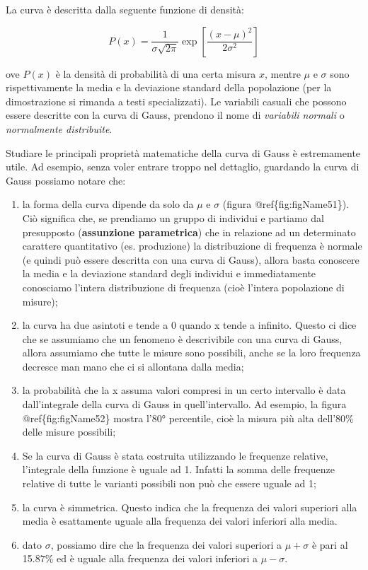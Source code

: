 \documentclass[a4paper,12pt,oneside]{book}
\providecommand{\tightlist}{%
  \setlength{\itemsep}{0pt}\setlength{\parskip}{0pt}}
\theoremstyle{definition}
\theoremstyle{definition}
\theoremstyle{definition}
\theoremstyle{remark}
\begin{document}
La curva è descritta dalla seguente funzione di densità:

\[P(x) = \frac{1}{{\sigma \sqrt {2\pi } }}\exp \left[{\frac{\left( {x - \mu } \right)^2 }{2\sigma ^2 }} \right]\]

ove \(P(x)\) è la densità di probabilità di una certa misura \(x\),
mentre \(\mu\) e \(\sigma\) sono rispettivamente la media e la
deviazione standard della popolazione (per la dimostrazione si rimanda a
testi specializzati). Le variabili casuali che possono essere descritte
con la curva di Gauss, prendono il nome di \emph{variabili normali} o
\emph{normalmente distribuite}.

Studiare le principali proprietà matematiche della curva di Gauss è
estremamente utile. Ad esempio, senza voler entrare troppo nel
dettaglio, guardando la curva di Gauss possiamo notare che:

\begin{enumerate}
\def\labelenumi{\arabic{enumi}.}
\tightlist
\item
  la forma della curva dipende da solo da \(\mu\) e \(\sigma\) (figura
  @ref\{fig:figName51\}). Ciò significa che, se prendiamo un gruppo di
  individui e partiamo dal presupposto (\textbf{assunzione parametrica})
  che in relazione ad un determinato carattere quantitativo (es.
  produzione) la distribuzione di frequenza è normale (e quindi può
  essere descritta con una curva di Gauss), allora basta conoscere la
  media e la deviazione standard degli individui e immediatamente
  conosciamo l'intera distribuzione di frequenza (cioè l'intera
  popolazione di misure);
\item
  la curva ha due asintoti e tende a 0 quando x tende a infinito. Questo
  ci dice che se assumiamo che un fenomeno è descrivibile con una curva
  di Gauss, allora assumiamo che tutte le misure sono possibili, anche
  se la loro frequenza decresce man mano che ci si allontana dalla
  media;
\item
  la probabilità che la x assuma valori compresi in un certo intervallo
  è data dall'integrale della curva di Gauss in quell'intervallo. Ad
  esempio, la figura @ref\{fig:figName52\} mostra l'80° percentile, cioè
  la misura più alta dell'80\% delle misure possibili;
\item
  Se la curva di Gauss è stata costruita utilizzando le frequenze
  relative, l'integrale della funzione è uguale ad 1. Infatti la somma
  delle frequenze relative di tutte le varianti possibili non può che
  essere uguale ad 1;
\item
  la curva è simmetrica. Questo indica che la frequenza dei valori
  superiori alla media è esattamente uguale alla frequenza dei valori
  inferiori alla media.
\item
  dato \(\sigma\), possiamo dire che la frequenza dei valori superiori a
  \(\mu + \sigma\) è pari al 15.87\% ed è uguale alla frequenza dei
  valori inferiori a \(\mu - \sigma\).
\end{enumerate}
\end{document}
